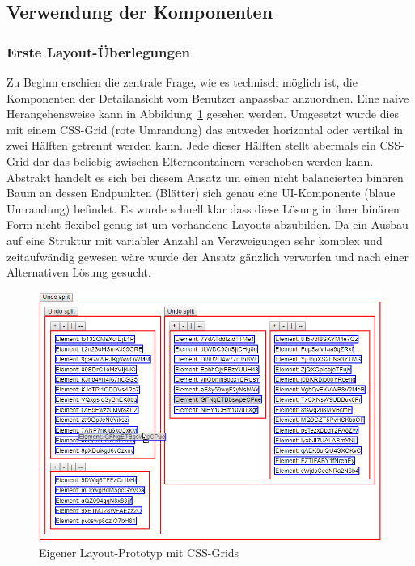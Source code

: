 \subsection{Verwendung der Komponenten}
\subsubsection{Erste Layout-Überlegungen}
Zu Beginn erschien die zentrale Frage, wie  es technisch möglich ist, die Komponenten der Detailansicht vom Benutzer anpassbar anzuordnen. Eine naive Herangehensweise kann in Abbildung~\ref{fig:layout_grid_test} gesehen werden. Umgesetzt wurde dies mit einem CSS-Grid (rote Umrandung) das entweder horizontal oder vertikal in zwei Hälften getrennt werden kann. Jede dieser Hälften stellt abermals ein CSS-Grid dar das beliebig zwischen Elterncontainern verschoben werden kann. Abstrakt handelt es sich bei diesem Ansatz um einen nicht balancierten binären Baum an dessen Endpunkten (Blätter) sich genau eine UI-Komponente (blaue Umrandung) befindet. Es wurde schnell klar dass diese Lösung in ihrer binären Form nicht flexibel genug ist um vorhandene Layouts abzubilden. Da ein Ausbau auf eine Struktur mit variabler Anzahl an Verzweigungen sehr komplex und zeitaufwändig gewesen wäre wurde der Ansatz gänzlich verworfen und nach einer Alternativen Lösung gesucht. 

\begin{figure}
    \centering
    \captionsetup{justification=centering}
    \includegraphics[width=\textwidth]{figures/layout_grid_test.png}
        \caption{Eigener Layout-Prototyp mit CSS-Grids}\label{fig:layout_grid_test}
\end{figure}

